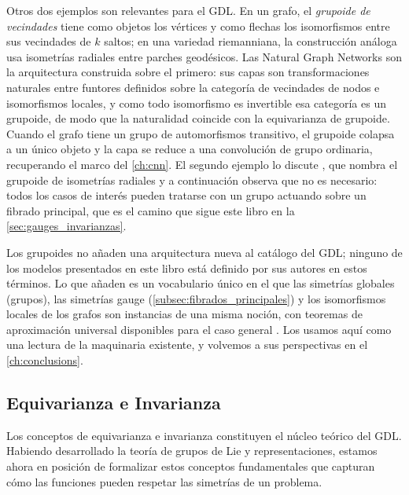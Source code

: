 Otros dos ejemplos son relevantes para el \gls{GDL}. En un grafo, el \textit{grupoide de vecindades} tiene como objetos los vértices y como flechas los isomorfismos entre sus vecindades de $k$ saltos; en una variedad riemanniana, la construcción análoga usa isometrías radiales entre parches geodésicos. Las Natural Graph Networks \citep{dehaan2020natural} son la arquitectura construida sobre el primero: sus capas son transformaciones naturales entre funtores definidos sobre la categoría de vecindades de nodos e isomorfismos locales, y como todo isomorfismo es invertible esa categoría es un grupoide, de modo que la naturalidad coincide con la equivarianza de grupoide. Cuando el grafo tiene un grupo de automorfismos transitivo, el grupoide colapsa a un único objeto y la capa se reduce a una convolución de grupo ordinaria, recuperando el marco del \autoref{ch:cnn}. El segundo ejemplo lo discute \citet{cohen2021thesis}, que nombra el grupoide de isometrías radiales y a continuación observa que no es necesario: todos los casos de interés pueden tratarse con un grupo actuando sobre un fibrado principal, que es el camino que sigue este libro en la \autoref{sec:gauges_invarianzas}.

\begin{remark}\label{rem:alcance_grupoides}
Los grupoides no añaden una arquitectura nueva al catálogo del \gls{GDL}; ninguno de los modelos presentados en este libro está definido por sus autores en estos términos. Lo que añaden es un vocabulario único en el que las simetrías globales (grupos), las simetrías gauge (\autoref{subsec:fibrados_principales}) y los isomorfismos locales de los grafos son instancias de una misma noción, con teoremas de aproximación universal disponibles para el caso general \citep{maruyama2025categorical, astwood2026liegroupoid}. Los usamos aquí como una lectura de la maquinaria existente, y volvemos a sus perspectivas en el \autoref{ch:conclusions}.
\end{remark}

\subsection{Equivarianza e Invarianza}\label{subsec:equivarianza_invarianza}

Los conceptos de equivarianza e invarianza constituyen el núcleo teórico del \gls{GDL}. Habiendo desarrollado la teoría de grupos de Lie y representaciones, estamos ahora en posición de formalizar estos conceptos fundamentales que capturan cómo las funciones pueden respetar las simetrías de un problema.

